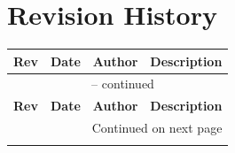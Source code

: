 \documentclass[11pt,a4paper]{article}
\begin{document}
\newpage
\section*{Revision History}

\begin{longtable}{@{}p{1.0cm}p{2.6cm}p{3.0cm}p{7.2cm}@{}}
    \toprule
    \textbf{Rev} & \textbf{Date} & \textbf{Author} & \textbf{Description} \\
    \midrule
    \endfirsthead
    \multicolumn{4}{c}{{\tablename~\thetable{} -- continued}} \\
    \toprule
    \textbf{Rev} & \textbf{Date} & \textbf{Author} & \textbf{Description} \\
    \midrule
    \endhead
    \midrule \multicolumn{4}{r}{{Continued on next page}} \\ \endfoot
    \bottomrule
    \endlastfoot


\end{longtable}
\end{document}
